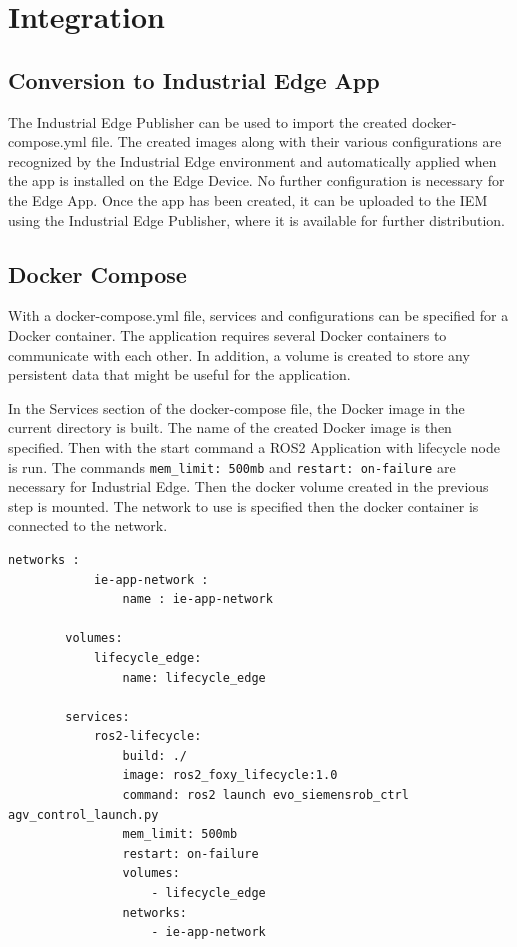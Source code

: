 \section{Integration}
\label{Implementierung:Integration}

\subsection{Conversion to Industrial Edge App} 
The Industrial Edge Publisher can be used to import the created docker-compose.yml file. The created images along with their various configurations are recognized by the Industrial Edge environment and automatically applied when the app is installed on the Edge Device. No further configuration is necessary for the Edge App. Once the app has been created, it can be uploaded to the IEM using the Industrial Edge Publisher, where it is available for further distribution.

\subsection{Docker Compose}
With a docker-compose.yml file, services and configurations can be specified for a Docker container. The application requires several Docker containers to communicate with each other. In addition, a volume is created to store any persistent data that might be useful for the application.

In the Services section of the docker-compose file, the Docker image in the current directory is built. The name of the created Docker image is then specified. Then with the start command a \gls{ROS2} Application with lifecycle node is run. The commands \lstinline{mem_limit: 500mb} and \lstinline{restart: on-failure} are necessary for Industrial Edge. Then the docker volume created in the previous step is mounted. The network to use is specified then the docker container is connected to the network.
\begin{lstlisting}[language=docker-compose,
		label={code:Vue}]
		networks :
 			ie-app-network :
	 			name : ie-app-network

		volumes:
			lifecycle_edge:
				name: lifecycle_edge
		
		services:
			ros2-lifecycle:
				build: ./
				image: ros2_foxy_lifecycle:1.0
				command: ros2 launch evo_siemensrob_ctrl agv_control_launch.py 
				mem_limit: 500mb
				restart: on-failure
				volumes:
					- lifecycle_edge
				networks:
					- ie-app-network		
\end{lstlisting}

